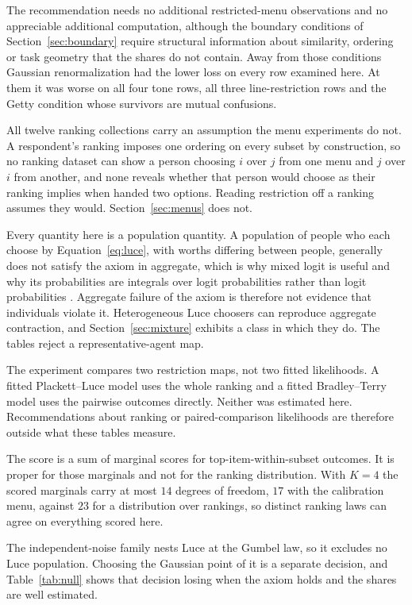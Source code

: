 \documentclass[11pt]{article}
\theoremstyle{italichead}
\begin{document}
The recommendation needs no additional restricted-menu observations and no appreciable additional
computation, although the boundary conditions of Section~\ref{sec:boundary} require structural
information about similarity, ordering or task geometry that the shares do not contain. Away from
those conditions Gaussian renormalization had the lower loss on every row examined here. At them
it was worse on all four tone rows, all three line-restriction rows and the Getty condition whose
survivors are mutual confusions.

All twelve ranking collections carry an assumption the menu experiments do not.
A respondent's ranking imposes one ordering on every subset by construction, so no
ranking dataset can show a person choosing $i$ over $j$ from one menu and $j$ over $i$
from another, and none reveals whether that person would choose as their ranking implies
when handed two options. Reading restriction off a ranking assumes they would.
Section~\ref{sec:menus} does not.

Every quantity here is a population quantity. A population of people who each choose by
Equation~\eqref{eq:luce}, with worths differing between people, generally does not
satisfy the axiom in aggregate, which is why mixed logit is useful and why its
probabilities are integrals over logit probabilities rather than logit probabilities
\cite{mcfaddentrain2000}. Aggregate failure of the axiom is therefore not evidence that
individuals violate it. Heterogeneous Luce choosers can reproduce aggregate contraction, and
Section~\ref{sec:mixture} exhibits a class in which they do. The tables reject a
representative-agent map.

The experiment compares two restriction maps, not two fitted likelihoods. A fitted
Plackett--Luce model \cite{plackett1975} uses the whole ranking and a fitted Bradley--Terry
model \cite{bradley1952} uses the pairwise outcomes directly. Neither was estimated here. Recommendations about ranking or
paired-comparison likelihoods are therefore outside what these tables measure.

The score is a sum of marginal scores for top-item-within-subset outcomes. It is proper
for those marginals and not for the ranking distribution. With $K = 4$ the scored
marginals carry at most $14$ degrees of freedom, $17$ with the calibration menu, against $23$ for a distribution over
rankings, so distinct ranking laws can agree on everything scored here.

The independent-noise family nests Luce at the Gumbel law, so it excludes no Luce population.
Choosing the Gaussian point of it is a separate decision, and Table~\ref{tab:null} shows that
decision losing when the axiom holds and the shares are well estimated.
\end{document}
